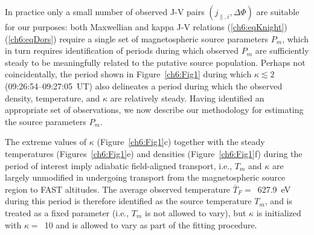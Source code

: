   In practice only a small number of observed J-V pairs $(
  j_{\parallel,i} , \Delta \Phi )$ are suitable for our purposes: both
  Maxwellian and kappa J-V relations (\ref{ch6:eqKnight})
  (\ref{ch6:eqDors}) require a single set of magnetospheric source
  parameters $P_m$, which in turn requires identification of periods
  during which observed $P_m$ are sufficiently steady to be
  meaningfully related to the putative source population. Perhaps not
  coincidentally, the period shown in Figure~\ref{ch6:Fig1} during
  which $\kappa \lesssim 2$ (09:26:54--09:27:05~UT) also delineates a
  period during which the observed density, temperature, and $\kappa$
  are relatively steady. Having identified an appropriate set of
  observations, we now describe our methodology for estimating the
  source parameters $P_m$.

  The extreme values of $\kappa$ (Figure~\ref{ch6:Fig1}c) together
  with the steady temperatures (Figures~\ref{ch6:Fig1}e) and densities
  (Figure~\ref{ch6:Fig1}f) during the period of interest imply
  adiabatic field-aligned transport, i.e., $T_m$ and $\kappa$ are
  largely unmodified in undergoing transport from the magnetospheric
  source region to FAST altitudes. The average observed temperature
  $\bar{T}_F =$~627.9~eV during this period is therefore identified as
  the source temperature $T_m$, and is treated as a fixed parameter
  (i.e., $T_m$ is not allowed to vary), but $\kappa$ is initialized
  with $\kappa =$~10 and is allowed to vary as part of the fitting
  procedure.
  
